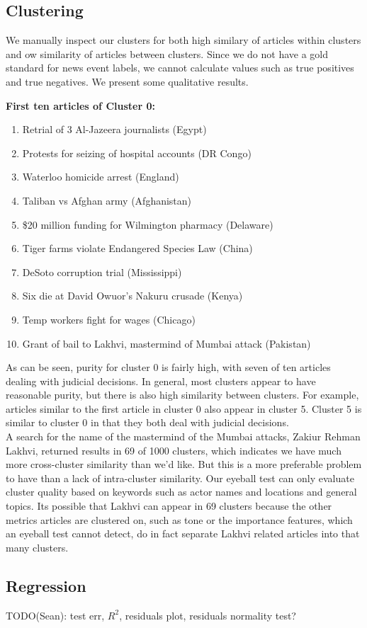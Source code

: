 
\subsection{Clustering}

We manually inspect our clusters for both high similary of articles within clusters and ow similarity of articles between clusters. Since we do not have a gold standard for news event labels, we cannot calculate values such as true positives and true negatives. We present some qualitative results.

\textbf{First ten articles of Cluster 0:}  
\begin{enumerate}
\item Retrial of 3 Al-Jazeera journalists (Egypt)
\item Protests for seizing of hospital accounts (DR Congo)
\item Waterloo homicide arrest (England)
\item Taliban vs Afghan army (Afghanistan)
\item \$20 million funding for Wilmington pharmacy (Delaware)
\item Tiger farms violate Endangered Species Law (China)
\item DeSoto corruption trial (Mississippi)
\item Six die at David Owuor's Nakuru crusade (Kenya)
\item Temp workers fight for wages (Chicago)
\item Grant of bail to Lakhvi, mastermind of Mumbai attack (Pakistan)
\end{enumerate}

As can be seen, purity for cluster 0 is fairly high, with seven of ten articles dealing with judicial decisions. In general, most clusters appear to have reasonable purity, but there is also high similarity between clusters. For example, articles similar to the first article in cluster 0 also appear in cluster 5. Cluster 5 is similar to cluster 0 in that they both deal with judicial decisions.\\

\noindent A search for the name of the mastermind of the Mumbai attacks, Zakiur Rehman Lakhvi, returned results in 69 of 1000 clusters, which indicates we have much more cross-cluster similarity than we'd like. But this is a more preferable problem to have than a lack of intra-cluster similarity. Our eyeball test can only evaluate cluster quality based on keywords such as actor names and locations and general topics. Its possible that Lakhvi can appear in 69 clusters because the other metrics articles are clustered on, such as tone or the importance features, which an eyeball test cannot detect, do in fact separate Lakhvi related articles into that many clusters.

\subsection{Regression}

TODO(Sean): test err, $R^2$, residuals plot, residuals normality test?